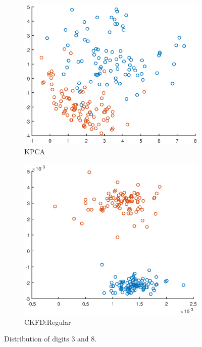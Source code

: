 \documentclass[7 pt]{article}
\begin{document}
\begin{figure}
\begin{center}
  \begin{subfigure}[b]{0.3\textwidth}
\includegraphics[scale=0.5]{figs/threeseightsKPCA.eps}         \caption{KPCA}
    \end{subfigure}
\quad \quad \quad \quad \quad \quad \quad 
    \begin{subfigure}[b]{0.3\textwidth}
\includegraphics[scale=0.5]{figs/thveireg.eps}         \caption{CKFD:Regular}
    \end{subfigure}
    \end{center}
    \caption{Distribution of digits 3 and 8.}     \label{fig:distances}
\end{figure}
\end{document}
